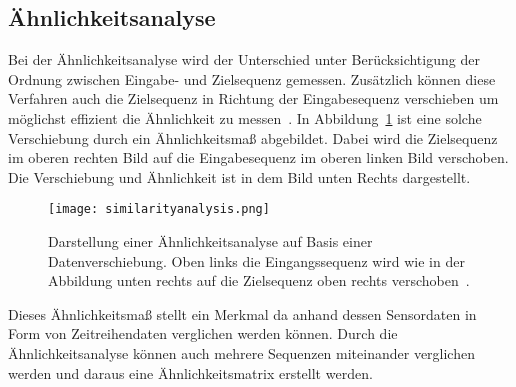 \subsection{Ähnlichkeitsanalyse}
Bei der Ähnlichkeitsanalyse wird der Unterschied unter Berücksichtigung der Ordnung zwischen Eingabe- und Zielsequenz gemessen. 
Zusätzlich können diese Verfahren auch die Zielsequenz in Richtung der Eingabesequenz verschieben um möglichst effizient die Ähnlichkeit zu messen~\cite{Leonard2018}. 
In Abbildung\ \ref{fig:similarityanalysis} ist eine solche Verschiebung durch ein Ähnlichkeitsmaß abgebildet. 
Dabei wird die Zielsequenz im oberen rechten Bild auf die Eingabesequenz im oberen linken Bild verschoben. Die Verschiebung und Ähnlichkeit ist in dem Bild unten Rechts dargestellt.
\begin{figure}
  \centering
  \texttt{[image: similarityanalysis.png]}
  \caption{Darstellung einer Ähnlichkeitsanalyse auf Basis einer Datenverschiebung. Oben links die Eingangssequenz wird wie in der Abbildung unten rechts auf die Zielsequenz oben rechts verschoben~\cite{Leonard2018}.}
  \label{fig:similarityanalysis}
\end{figure}

Dieses Ähnlichkeitsmaß stellt ein Merkmal da anhand dessen Sensordaten in Form von Zeitreihendaten verglichen werden können. 
Durch die Ähnlichkeitsanalyse können auch mehrere Sequenzen miteinander verglichen werden und daraus eine Ähnlichkeitsmatrix erstellt werden.